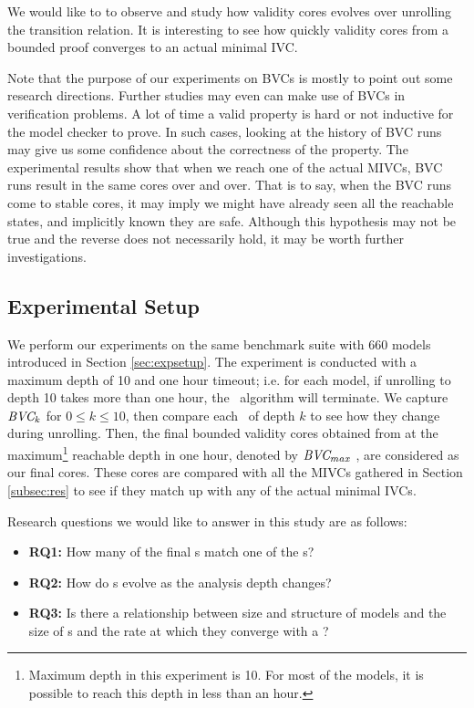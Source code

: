 We would like to to observe and study how validity cores evolves over unrolling the transition relation. It is interesting to see how quickly validity cores from a bounded proof converges to an actual minimal IVC.

Note that the purpose of our experiments on BVCs is mostly to point out some research directions. Further studies may even can make use of BVCs in verification problems. A lot of time a valid property is hard or not inductive for the model checker to prove. In such cases, looking at the history of BVC runs may give us some confidence about the correctness of the property. The experimental results show that when we reach one of the actual MIVCs, BVC runs result in the same cores over and over. That is to say, when the BVC runs come to stable cores, it may imply we might have already seen all the reachable states, and implicitly known they are safe. Although this hypothesis may not be true and the reverse does not necessarily hold, it may be worth further investigations.

\subsection{Experimental Setup}
  We perform our experiments on the same benchmark suite with 660 models introduced in Section \ref{sec:expsetup}. The experiment is conducted with a maximum depth of 10 and one hour timeout; i.e. for each model, if unrolling to depth 10 takes more than one hour, the \bvcalg\ algorithm will terminate. We capture $\textit{BVC} _{k}$ for $ 0 \leq k \le 10$, then compare each \bvc\ of depth $k$ to see how they change during unrolling. Then, the final bounded validity cores obtained from at the maximum\footnote{Maximum depth in this experiment is 10. For most of the models, it is possible to reach this depth in less than an hour.}
  reachable depth in one hour, denoted by $\textit{BVC} _{max}$ , are considered as our final cores. These cores are compared with all the MIVCs gathered in Section \ref{subsec:res} to see if they match up with any of the actual minimal IVCs.

Research questions we would like to answer in this study are as follows:
\begin{itemize}
  \item \textbf{RQ1:} How many of the final \bvc s match one of the \mivc s?
  \item \textbf{RQ2:} How do \bvc s evolve as the analysis depth changes?
  \item \textbf{RQ3:} Is there a relationship between size and structure of models and the size of \bvc s and the rate at which they converge with a \mivc?
\end{itemize}

